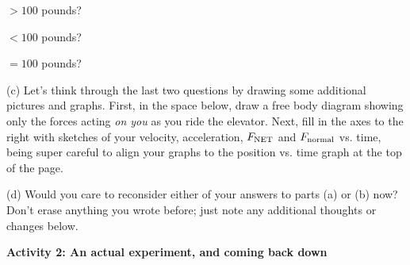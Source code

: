 \hspace{0.5in} $> 100$ pounds?

\hspace{0.5in} $< 100$ pounds?

\hspace{0.5in} $= 100$ pounds?

\begin{wrapfigure}[8]{r}{0.5\textwidth}
\end{wrapfigure}

\bigskip
(c) Let's think through the last two questions by drawing some additional pictures and graphs.  First, in the space below, draw a free body diagram showing only the forces acting \textit{on you} as you ride the elevator.  Next, fill in the axes to the right with sketches of your velocity, acceleration, $F_{\rm NET}$ and $F_{\rm normal}$ vs. time, being super careful to align your graphs to the position vs. time graph at the top of the page.
\answerspace{1in}

\newpage
(d) Would you care to reconsider either of your answers to parts (a) or (b) now?  Don't erase anything you wrote before; just note any additional thoughts or changes below.
\answerspace{0.8in}


\textbf{Activity 2: An actual experiment, and coming back down}

